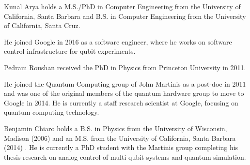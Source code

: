 \documentclass[journal]{IEEEtran}
\begin{document}
\begin{IEEEbiography}{Kunal Arya} holds a M.S./PhD in Computer Engineering from the University of California, Santa Barbara and B.S. in Computer Engineering from the University of California, Santa Cruz. 

He joined Google in 2016 as a software engineer, where he works on software control infrastructure for qubit experiments.


\end{IEEEbiography}
\begin{IEEEbiography}{Pedram Roushan} received the PhD in Physics from Princeton University in 2011. 

He joined the Quantum Computing group of John Martinis as a post-doc in 2011 and was one of the original members of the quantum hardware group to move to Google in 2014. He is currently a staff research scientist at Google, focusing on quantum computing technology.
\end{IEEEbiography}
\begin{IEEEbiography}{Benjamin Chiaro} holds a B.S. in Physics from the University of Wisconsin, Madison (2006) and an M.S. from the University of California, Santa Barbara (2014) .  He is currently a PhD student with the Martinis group completing his thesis research on analog control of multi-qubit systems and quantum simulation.

\end{IEEEbiography}
\end{document}
